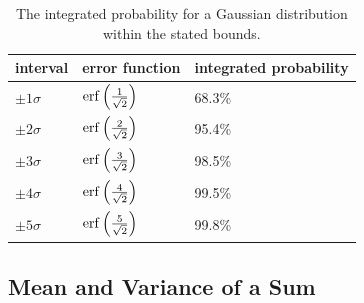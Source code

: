 \documentclass[12pt]{article}
\begin{document}
\begin{table}[thb]
\begin{center}
\begin{tabular}{lll}
interval & error function & integrated probability \\ 
\hline
$\pm1 \sigma$ & ${\rm erf}\left( \frac{1}{\sqrt{2}} \right)$ & 68.3\% \\
$\pm2 \sigma$ & ${\rm erf}\left( \frac{2}{\sqrt{2}} \right)$ & 95.4\% \\
$\pm3 \sigma$ & ${\rm erf}\left( \frac{3}{\sqrt{2}} \right)$ & 98.5\% \\
$\pm4 \sigma$ & ${\rm erf}\left( \frac{4}{\sqrt{2}} \right)$ & 99.5\% \\
$\pm5 \sigma$ & ${\rm erf}\left( \frac{5}{\sqrt{2}} \right)$ & 99.8\% \\ 
\end{tabular}
\caption{\label{tbl:erf} The integrated probability for a Gaussian distribution within the stated bounds.} 
\end{center}
\end{table}

\subsection{Mean and Variance of a Sum}
\end{document}
